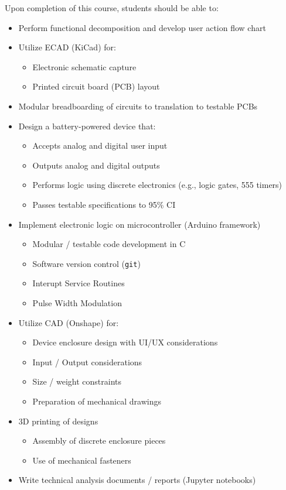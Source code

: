 \documentclass[10pt]{report}
\begin{document}
Upon completion of this course, students should be able to:

\begin{itemize}
    \item Perform functional decomposition and develop user action flow chart
    \item Utilize ECAD (KiCad) for:
    \begin{itemize}
        \item Electronic schematic capture
        \item Printed circuit board (PCB) layout
    \end{itemize}
    \item Modular breadboarding of circuits to translation to testable PCBs
    \item Design a battery-powered device that:
    \begin{itemize}
        \item Accepts analog and digital user input
        \item Outputs analog and digital outputs
        \item Performs logic using discrete electronics (e.g., logic gates, 555 timers)
        \item Passes testable specifications to 95\% CI
    \end{itemize}
    \item Implement electronic logic on microcontroller (Arduino framework)
    \begin{itemize}
        \item Modular / testable code development in C
        \item Software version control (\texttt{git})
        \item Interupt Service Routines
        \item Pulse Width Modulation
    \end{itemize}
    \item Utilize CAD (Onshape) for:
    \begin{itemize}
        \item Device enclosure design with UI/UX considerations
        \item Input / Output considerations
        \item Size / weight constraints
        \item Preparation of mechanical drawings
    \end{itemize}
    \item 3D printing of designs
    \begin{itemize}
        \item Assembly of discrete enclosure pieces
        \item Use of mechanical fasteners
    \end{itemize}
    \item Write technical analysis documents / reports (Jupyter notebooks)
\end{itemize}
\end{document}
